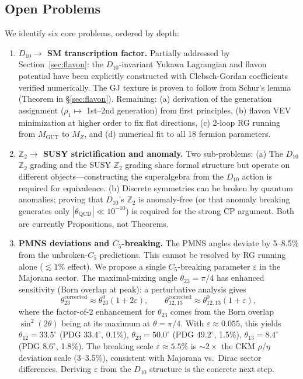 \documentclass[11pt,a4paper]{article}
\begin{document}
\subsection{Open Problems}

We identify six core problems, ordered by depth:

\begin{enumerate}
\item \textbf{$D_{10} \to$ SM transcription factor.} Partially addressed by Section~\ref{sec:flavon}: the $D_{10}$-invariant Yukawa Lagrangian and flavon potential have been explicitly constructed with Clebsch-Gordan coefficients verified numerically. The GJ texture is proven to follow from Schur's lemma (Theorem in \S\ref{sec:flavon}). Remaining: (a) derivation of the generation assignment ($\rho_1 \mapsto$ 1st--2nd generation) from first principles, (b) flavon VEV minimization at higher order to fix flat directions, (c) 2-loop RG running from $M_{\text{GUT}}$ to $M_Z$, and (d) numerical fit to all 18 fermion parameters.

\item \textbf{$\mathbb{Z}_2 \to$ SUSY strictification and anomaly.} Two sub-problems: (a) The $D_{10}$ $\mathbb{Z}_2$ grading and the SUSY $\mathbb{Z}_2$ grading share formal structure but operate on different objects---constructing the superalgebra from the $D_{10}$ action is required for equivalence. (b) Discrete symmetries can be broken by quantum anomalies; proving that $D_{10}$'s $\mathbb{Z}_2$ is anomaly-free (or that anomaly breaking generates only $|\theta_{\text{QCD}}| \ll 10^{-10}$) is required for the strong CP argument. Both are currently Propositions, not Theorems.

\item \textbf{PMNS deviations and $C_5$-breaking.} The PMNS angles deviate by 5--8.5\% from the unbroken-$C_5$ predictions. This cannot be resolved by RG running alone ($\lesssim 1\%$ effect). We propose a single $C_5$-breaking parameter $\varepsilon$ in the Majorana sector. The maximal-mixing angle $\theta_{23} = \pi/4$ has enhanced sensitivity (Born overlap at peak): a perturbative analysis gives
\[
\theta_{23}^{\text{corrected}} \approx \theta_{23}^0(1 + 2\varepsilon), \qquad \theta_{12,13}^{\text{corrected}} \approx \theta_{12,13}^0(1 + \varepsilon),
\]
where the factor-of-2 enhancement for $\theta_{23}$ comes from the Born overlap $\sin^2(2\theta)$ being at its maximum at $\theta = \pi/4$. With $\varepsilon \approx 0.055$, this yields $\theta_{12} = 33.5^\circ$ (PDG $33.4^\circ$, 0.1\%), $\theta_{23} = 50.0^\circ$ (PDG $49.2^\circ$, 1.5\%), $\theta_{13} = 8.4^\circ$ (PDG $8.6^\circ$, 1.8\%). The breaking scale $\varepsilon \approx 5.5\%$ is $\sim 2\times$ the CKM $\rho$/$\eta$ deviation scale (3--3.5\%), consistent with Majorana vs.\ Dirac sector differences. Deriving $\varepsilon$ from the $D_{10}$ structure is the concrete next step.


\end{enumerate}
\end{document}
